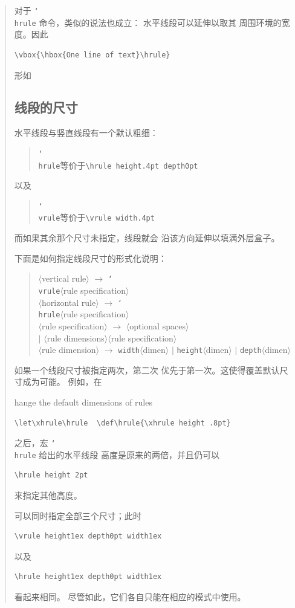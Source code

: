 \documentclass[a4paper]{rapport3}
\def\nl{\protect\\}\def\n#1{{\tt #1}}\def\cs#1{{\tt\char`\\#1}}\let\csc\cs
\def\gr#1{$\langle$#1$\rangle$}\def\key#1{{\tt#1}}
\def\alt{}\def\altt{}%
\newenvironment{disp}{\begin{quotation}}{\end{quotation}}
\newenvironment{Disp}{\begin{quotation}}{\end{quotation}}
\def\howto#1\par{}
\begin{document}
\begin{disp}
对于 \cs{hrule} 命令，类似的说法也成立：
水平线段可以延伸以取其
周围环境的宽度。因此 
\begin{verbatim}
\vbox{\hbox{One line of text}\hrule}
\end{verbatim}
形如
\begin{disp}\leavevmode{}\end{disp}


\subsection{线段的尺寸}

水平线段与竖直线段有一个默认粗细：
\begin{Disp} \cs{hrule}\quad 等价于\quad \verb-\hrule height.4pt depth0pt-
\end{Disp}
以及
\begin{Disp} \cs{vrule}\quad 等价于\quad \verb-\vrule width.4pt- \end{Disp}
而如果其余那个尺寸未指定，线段就会
沿该方向延伸以填满外层盒子。

下面是如何指定线段尺寸的形式化说明：
\begin{disp}\gr{vertical rule} $\longrightarrow$ 
                        \cs{vrule}\gr{rule specification}\nl
     \gr{horizontal rule} $\longrightarrow$
                        \cs{hrule}\gr{rule specification}\nl
     \gr{rule specification} $\longrightarrow$
                        \gr{optional spaces} \nl \indent$|$
                        \gr{rule dimensions}\gr{rule specification}\nl
     \gr{rule dimension} $\longrightarrow$
                        \n{width}\gr{dimen} $|$ \n{height}\gr{dimen} $|$
                        \n{depth}\gr{dimen}
     \end{disp}
如果一个线段尺寸被指定两次，第二次
优先于第一次。这使得覆盖默认尺寸成为可能。
例如，在
\alt
\howto Change the default dimensions of rules\par
\begin{verbatim}
\let\xhrule\hrule  \def\hrule{\xhrule height .8pt}
\end{verbatim}
之后，宏 \cs{hrule} 给出的水平线段
高度是原来的两倍，并且仍可以 \begin{verbatim}
\hrule height 2pt
\end{verbatim}
来指定其他高度。

可以同时指定全部三个尺寸；此时
\begin{verbatim}
\vrule height1ex depth0pt width1ex
\end{verbatim}
以及
\begin{verbatim}
\hrule height1ex depth0pt width1ex
\end{verbatim}
看起来相同。
尽管如此，它们各自只能在相应的模式中使用。


\end{disp}
\end{document}
